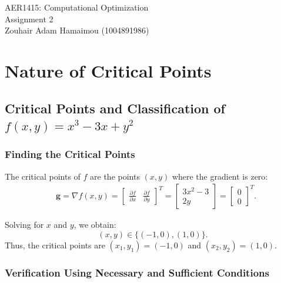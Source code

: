 \documentclass[12pt]{article}
\newcommand{\studentname}{Zouhair Adam Hamaimou (1004891986)}
\newcommand{\coursename}{AER1415: Computational Optimization}
\newcommand{\assignmentname}{Assignment 2}
\begin{document}
\begin{center}
  \huge \coursename \\
  \LARGE \assignmentname \\
  \vspace{1em}
  \normalsize \studentname
\end{center}


\section{Nature of Critical Points}

\subsection{Critical Points and Classification of \( f(x, y) = x^3 - 3x + y^2 \)}

\subsubsection{Finding the Critical Points}

The critical points of \( f \) are the points \( (x, y) \) where the gradient is zero:
\begin{align*}
& \mathbf{g} = \nabla f(x, y) = \begin{bmatrix} \frac{\partial f}{\partial x} & \frac{\partial f}{\partial y} \end{bmatrix}^T
= \begin{bmatrix} 3x^2 - 3 \\ 2y \end{bmatrix}
= \begin{bmatrix} 0 \\ 0 \end{bmatrix}^T.
\end{align*}

Solving for \( x \) and \( y \), we obtain:
\[
(x, y) \in \{(-1, 0), (1, 0) \}.
\]
Thus, the critical points are \( (x_1, y_1) = (-1, 0) \) and \( (x_2, y_2) = (1, 0) \).

\subsubsection{Verification Using Necessary and Sufficient Conditions}
\end{document}
